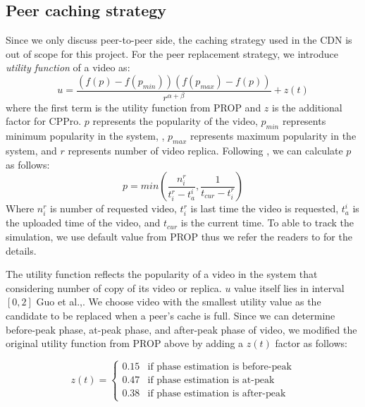 \subsection{Peer caching strategy}\label{peercachingstrategy}

Since we only discuss peer-to-peer side, the caching strategy used in the CDN is out of scope for this project. 
For the peer replacement strategy, we introduce \textit{utility function} of a video as:
\begin{equation}
u = \frac{ (f(p) - f(p_{min})) (f(p_{max}) - f(p)) }{r^{\alpha + \beta}} + z(t)
\end{equation}
where the first term is the utility function from PROP and $z$ is the additional factor for CPPro. 
$p$ represents the popularity of the video, $p_{min}$ represents minimum popularity in the system, , $p_{max}$ represents maximum popularity in the system, and $r$ represents number of video replica.
Following \cite{1613869}, we can calculate $p$ as follows:
\begin{equation}
p = min \left(\frac{n_i^r}{t_i^r - t_a^i}  , \frac{1}{t_{cur} - t_i^r}\right)
\end{equation}
Where $n_i^r$ is number of requested video, $t_i^r$ is last time the video is requested, $t_a^i$ is the uploaded time of the video, and $t_{cur}$ is the current time.
To able to track the simulation, we use default value from PROP thus we refer the readers to \cite{1613869} for the details.

The utility function reflects the popularity of a video in the system that considering number of copy of its video or replica. 
$u$ value itself lies in interval $[0,2]$ Guo et al.,\cite{1613869}.
We choose video with the smallest utility value as the candidate to be replaced when a peer's cache is full.
Since we can determine before-peak phase, at-peak phase, and after-peak phase of video, we modified the original utility function from PROP above by adding a $z(t)$ factor as follows:



\begin{equation}
 z(t) = 
  \begin{cases}
   0.15 & \text{if phase estimation is before-peak} \\
   0.47 & \text{if phase estimation is at-peak} \\
   0.38 & \text{if phase estimation is after-peak}
  \end{cases}
\end{equation}\label{eq:zfactor}

